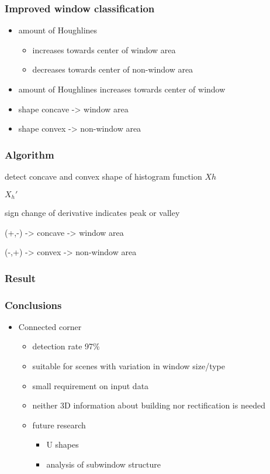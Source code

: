 \documentclass{beamer}
\begin{document}
\frame
{
}

\frame
{
	\frametitle{Improved window classification}
	\begin{itemize}
	\item amount of Houghlines 
		\begin{itemize}
		\item increases towards center of window area
		\item decreases towards center of non-window area
		\end{itemize}
	\item amount of Houghlines increases towards center of window
	\item shape concave -> window area
	\item shape convex -> non-window area
	\end{itemize}
}
\frame
{
}

\frame
{
	\frametitle{Algorithm}
	\item detect concave and convex shape of histogram function $Xh$
	\item $X_{h}'$ 
	\item sign change of derivative indicates peak or valley
	\item (+,-) -> concave -> window area
	\item (-,+) -> convex -> non-window area
}

\frame
{
	\frametitle{Result}
}

\frame
{
}

\frame
{
}

\frame
{
	\frametitle{Conclusions}
	\begin{itemize}
	\item Connected corner
		\begin{itemize}
		\item detection rate 97\%
		\item suitable for scenes with variation in window size/type
		\item small requirement on input data
			\item neither 3D information about building nor rectification is needed
		\item future research
			\begin{itemize}			
			\item U shapes 
			\item analysis of subwindow structure
			\end{itemize}			
		\end{itemize}
	\end{itemize}
}
\end{document}
